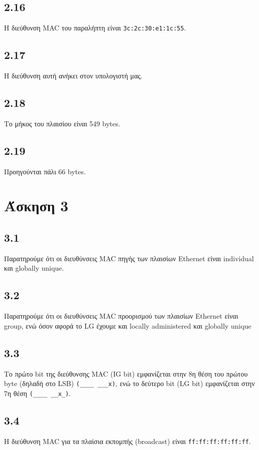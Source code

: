 		\subsection*{2.16}
			Η διεύθυνση MAC του παραλήπτη είναι \verb|3c:2c:30:e1:1c:55|.
		
		\subsection*{2.17}
			Η διεύθυνση αυτή ανήκει στον υπολογιστή μας.
		
		\subsection*{2.18}
			Το μήκος του πλαισίου είναι 549 bytes.
		
		\subsection*{2.19}
			Προηγούνται πάλι 66 bytes.

	\section*{Άσκηση 3}
	
		\subsection*{3.1}
			Παρατηρούμε ότι οι διευθύνσεις MAC πηγής των πλαισίων Ethernet είναι individual και globally unique.
			
		
		\subsection*{3.2} 
			Παρατηρούμε ότι οι διευθύνσεις MAC προορισμού των πλαισίων Ethernet είναι group, ενώ όσον αφορά το LG έχουμε και locally administered και globally unique
		
		\subsection*{3.3}
			Το πρώτο bit της διεύθυνσης MAC (IG bit) εμφανίζεται στην 8η θέση του πρώτου byte (δηλαδή στο LSB) \verb|(____ ___x)|, ενώ το δεύτερο bit (LG bit) εμφανίζεται στην 7η θέση \verb|(____ __x_)|. 
		
		\subsection*{3.4}
			Η διεύθυνση MAC για τα πλαίσια εκπομπής (broadcast) είναι \verb|ff:ff:ff:ff:ff:ff|.
		
